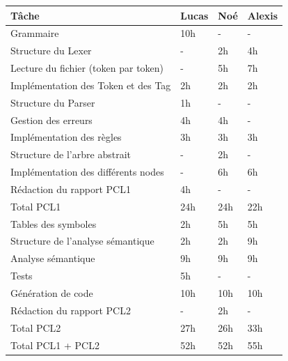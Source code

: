 \documentclass[french,a4paper]{article}
\begin{document}
    \begin{tabular}{@{}llll@{}}
        \toprule
        Tâche & Lucas & Noé & Alexis \\ \midrule
        Grammaire & 10h & - & - \\
        Structure du Lexer & - & 2h & 4h \\
        Lecture du fichier (token par token) & - & 5h & 7h \\
        Implémentation des Token et des Tag & 2h & 2h & 2h \\
        Structure du Parser & 1h & - & - \\
        Gestion des erreurs & 4h & 4h & - \\
        Implémentation des règles & 3h & 3h & 3h \\
        Structure de l'arbre abstrait & - & 2h & - \\
        Implémentation des différents nodes & - & 6h & 6h \\
        Rédaction du rapport PCL1 & 4h & - & - \\
        \midrule
        Total PCL1 & 24h & 24h & 22h \\ \bottomrule
        Tables des symboles & 2h & 5h & 5h \\
        Structure de l'analyse sémantique & 2h & 2h & 9h \\
        Analyse sémantique & 9h & 9h & 9h \\
        Tests & 5h & - & - \\
        Génération de code & 10h & 10h & 10h \\
        Rédaction du rapport PCL2 & - & 2h & - \\
        \midrule
        Total PCL2 & 27h & 26h & 33h \\ \bottomrule
        \midrule
        Total PCL1 + PCL2 & 52h & 52h & 55h \\ \bottomrule

    \end{tabular}
\end{document}
